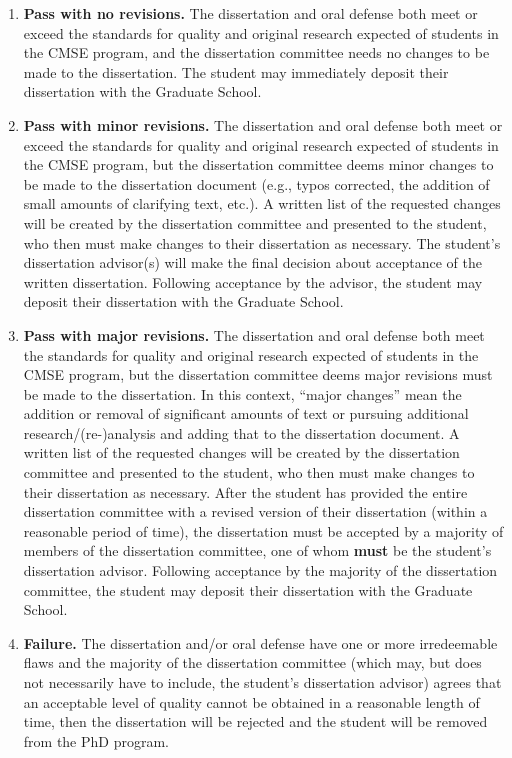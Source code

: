\begin{enumerate}

\item \textbf{Pass with no revisions.}  The dissertation and oral
  defense both meet or exceed the standards for quality and original
  research expected of students in the CMSE program, and the dissertation
  committee needs no changes to be made to the dissertation.  The
  student may immediately deposit their dissertation with the Graduate
  School.

\item  \textbf{Pass with minor revisions.}  The dissertation and oral
  defense both meet or exceed the standards  for quality and original
  research expected of students in the CMSE program, but the dissertation
  committee deems minor changes to be made to the dissertation
  document (e.g., typos corrected, the addition of small amounts of
  clarifying text, etc.).  A written list of the requested changes
  will be created by the dissertation committee and presented to the
  student, who then must make changes to their dissertation as
  necessary.  The student's dissertation advisor(s) will make the
  final decision about acceptance of the written dissertation.
  Following acceptance by the advisor, the student may deposit their
  dissertation with the Graduate School.

\item  \textbf{Pass with major revisions.}  The dissertation and oral
  defense both meet the standards for quality and original research
  expected of students in the CMSE program, but the dissertation committee
  deems major revisions must be made to the dissertation.  In this
  context, ``major changes'' mean the addition or removal of significant
  amounts of text or pursuing additional research/(re-)analysis and
  adding that to the dissertation document.  A written list of the
  requested changes will be created by the dissertation committee and
  presented to the student, who then must make changes to their
  dissertation as necessary.  After the student has provided the
  entire dissertation committee with a revised version of their dissertation
  (within a reasonable period of time), the dissertation must be accepted by
  a majority of members of the dissertation committee, one of whom
  \textbf{must} be the student's dissertation advisor.  Following acceptance
  by the majority of the dissertation committee, the student may deposit
  their dissertation with the Graduate School.

\item  \textbf{Failure.} The dissertation and/or oral defense have one
  or more irredeemable flaws and the majority of the dissertation
  committee (which may, but does not necessarily have to include, the student's dissertation advisor)
  agrees that an acceptable level of quality cannot be obtained in a
  reasonable length of time, then the dissertation will be rejected
  and the student will be removed from the PhD program.


\end{enumerate}

